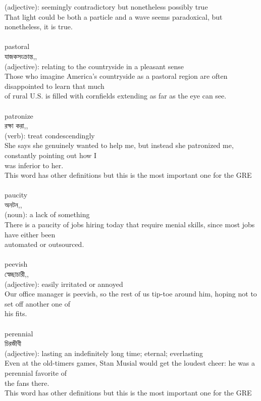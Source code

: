 \documentclass{article}
\begin{document}
{(adjective): seemingly contradictory but nonetheless possibly true\\That light could be both a particle and a wave seems paradoxical, but nonetheless, it is true.\\}\\
{pastoral}\\
{যাজকসংক্রান্ত,,}\\
{(adjective): relating to the countryside in a pleasant sense\\Those who imagine America's countryside as a pastoral region are often disappointed to learn that much\\of rural U.S. is filled with cornfields extending as far as the eye can see.\\}\\
{patronize}\\
{রক্ষা করা,,}\\
{(verb): treat condescendingly\\She says she genuinely wanted to help me, but instead she patronized me, constantly pointing out how I\\was inferior to her.\\This word has other definitions but this is the most important one for the GRE\\}\\
{paucity}\\
{অনটন,,}\\
{(noun): a lack of something\\There is a paucity of jobs hiring today that require menial skills, since most jobs have either been\\automated or outsourced.\\}\\
{peevish}\\
{স্বেচ্ছাচারী,,}\\
{(adjective): easily irritated or annoyed\\Our office manager is peevish, so the rest of us tip-toe around him, hoping not to set off another one of\\his fits.\\}\\
{perennial}\\
{চিরজীবী}\\
{(adjective): lasting an indefinitely long time; eternal; everlasting\\Even at the old-timers games, Stan Musial would get the loudest cheer: he was a perennial favorite of\\the fans there.\\This word has other definitions but this is the most important one for the GRE\\}\\
\end{document}
